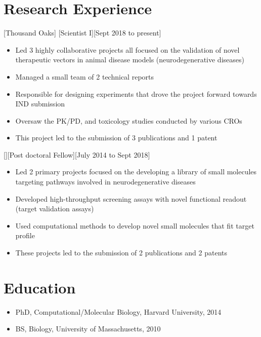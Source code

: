 \documentclass{article}
\begin{document}
\section{Research Experience}

[Thousand Oaks]
[Scientist I][Sept 2018 to present]

\begin{itemize}
\item Led 3 highly collaborative projects all focused on the validation of novel therapeutic vectors in animal disease models (neurodegenerative diseases)
\item Managed a small team of 2 technical reports
\item Responsible for designing experiments that drove the project forward towards IND submission
\item Oversaw the PK/PD, and toxicology studies conducted by various CROs
\item This project led to the submission of 3 publications and 1 patent
\end{itemize}

[][Post doctoral Fellow][July 2014 to Sept 2018]

\begin{itemize}
\item Led 2 primary projects focused on the developing a library of small molecules targeting pathways involved in neurodegenerative diseases
\item Developed high-throughput screening assays with novel functional readout (target validation assays)
\item Used computational methods to develop novel small molecules that fit target profile
\item These projects led to the submission of 2 publications and 2 patents
\end{itemize}

 
\section{Education}

\begin{itemize}
\item PhD, Computational/Molecular Biology, Harvard University, 2014  
\item BS, Biology, University of Massachusetts, 2010
\end{itemize}
 
\end{document}
